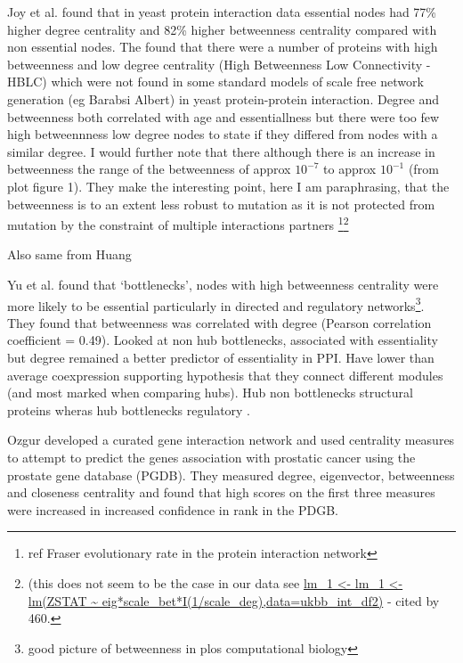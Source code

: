     Joy et al.\cite{joy2005high} found that in yeast protein interaction data essential nodes had 77\% higher degree centrality and 82\% higher betweenness centrality compared with non essential nodes. The found that there were a number of proteins with high betweenness and low degree centrality (High Betweenness Low Connectivity - HBLC) which were not found in some standard models of scale free network generation (eg Barabsi Albert) in yeast protein-protein interaction. Degree and betweenness both correlated with age and essentiallness but there were too few high betweennness low degree nodes to state if they differed from nodes with a similar degree. I would further note that there although there is an increase in betweenness the range of the betweenness of approx $10^{-7}$ to approx $10^{-1}$ (from plot figure 1). They make the interesting point, here I am paraphrasing, that the betweenness is to an extent less robust to mutation as it is not protected from mutation by the constraint of multiple interactions partners \footnote{ref Fraser evolutionary rate in the protein interaction network}\footnote{(this does not seem to be the case in our data see \url{lm_1 <- lm_1 <- lm(ZSTAT ~  eig*scale_bet*I(1/scale_deg),data=ukbb_int_df2)} - cited by 460.}
    
    
Also same from Huang


Yu et al.\cite{yu2007importance} found that `bottlenecks', nodes with high betweenness centrality were more likely to be essential particularly in directed and regulatory networks\footnote{good picture of betweenness in plos computational biology}. They found that betweenness was correlated with degree (Pearson correlation coefficient = 0.49). Looked at non hub bottlenecks, associated with essentiality but degree remained a better predictor of essentiality in PPI. Have lower than average coexpression supporting hypothesis that they connect different modules (and most marked when comparing hubs). Hub non bottlenecks structural proteins wheras hub bottlenecks regulatory .

Ozgur\cite{ozgur2008identifying} developed a curated gene interaction network and used centrality measures to attempt to predict the genes association with prostatic cancer using the prostate gene database (PGDB). They measured degree, eigenvector, betweenness and closeness centrality and found that high scores on the first three measures were increased in increased confidence in rank in the PDGB.

